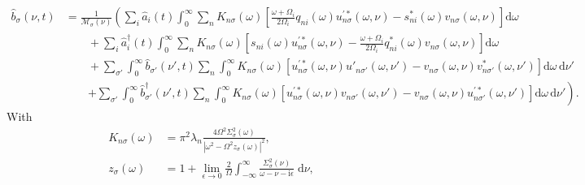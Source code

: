 \begin{equation}
\begin{split}
\hat{b}_\sigma(\nu,t) 
&= \frac{1}{\mathcal{M}_\sigma(\nu)}\left(\sum_i\hat{a}_i(t)\int_0^\infty\sum_n K_{n\sigma}(\omega)\left[\frac{\omega + \Omega_i}{2\Omega_i}q_{ni}(\omega)u_{n\sigma}^{\prime*}(\omega,\nu) - s_{ni}^*(\omega)v_{n\sigma}(\omega,\nu)\right]\mathrm{d}\omega\right.\\
&\qquad + \sum_i\hat{a}_i^\dagger(t)\int_0^\infty\sum_nK_{n\sigma}(\omega)\left[s_{ni}(\omega)u_{n\sigma}^{\prime*}(\omega,\nu) - \frac{\omega + \Omega_i}{2\Omega_i}q_{ni}^*(\omega)v_{n\sigma}(\omega,\nu)\right]\mathrm{d}\omega\\
&\qquad + \sum_{\sigma'}\int_0^\infty\hat{b}_{\sigma'}(\nu',t)\sum_n\int_0^\infty K_{n\sigma}(\omega)\left[u_{n\sigma}^{\prime*}(\omega,\nu)u'_{n\sigma'}(\omega,\nu') - v_{n\sigma}(\omega,\nu)v_{n\sigma'}^*(\omega,\nu')\right]\mathrm{d}\omega\,\mathrm{d}\nu'\\
&\qquad\left. + \sum_{\sigma'}\int_0^\infty\hat{b}_{\sigma'}^\dagger(\nu',t)\sum_n\int_0^\infty K_{n\sigma}(\omega)\left[u_{n\sigma}^{\prime*}(\omega,\nu)v_{n\sigma'}(\omega,\nu') - v_{n\sigma}(\omega,\nu)u_{n\sigma'}^{\prime*}(\omega,\nu')\right]\mathrm{d}\omega\,\mathrm{d}\nu'\right).
\end{split}
\end{equation}
With
\begin{equation}
\begin{split}
K_{n\sigma}(\omega) &= \pi^2\lambda_n\frac{4\Omega^2\Sigma_\sigma^2(\omega)}{|\omega^2 - \Omega^2z_\sigma(\omega)|^2},\\
z_\sigma(\omega) &= 1 + \lim_{\epsilon\to0}\frac{2}{\Omega}\int_{-\infty}^\infty\frac{\Sigma_\sigma^2(\nu)}{\omega - \nu - \mathrm{i}\epsilon}\;\mathrm{d}\nu,
\end{split}
\end{equation}
